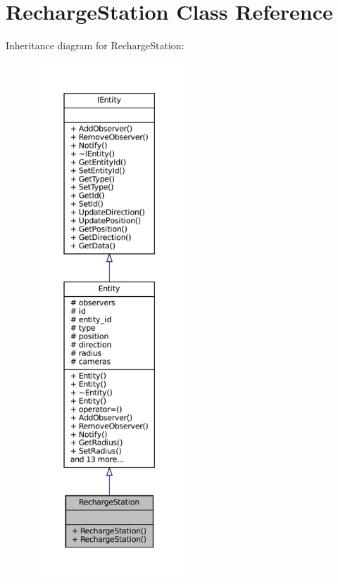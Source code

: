 \hypertarget{classRechargeStation}{}\section{Recharge\+Station Class Reference}
\label{classRechargeStation}


Inheritance diagram for Recharge\+Station\+:\nopagebreak
\begin{figure}[H]
\begin{center}
\leavevmode
\includegraphics[height=550pt]{classRechargeStation__inherit__graph}
\end{center}
\end{figure}


